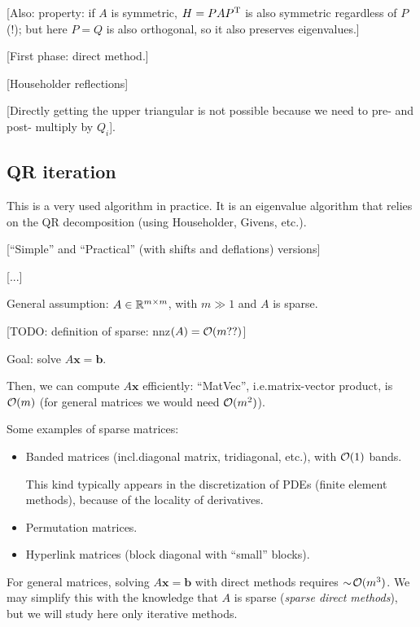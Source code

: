 \documentclass[
  12pt,
  paper=a4,
]{scrartcl} %
\begin{document}
[Also: property: if $A$ is symmetric, $H = PAP^{\mathrm{T}}$ is also symmetric regardless of $P$ (!); but here $P=Q$ is also orthogonal, so it also preserves eigenvalues.]

[First phase: direct method.]

[Householder reflections]

[Directly getting the upper triangular is not possible because we need to pre- and post- multiply by $Q_i$].

\subsection*{QR iteration}
This is a very used algorithm in practice. It is an eigenvalue algorithm that relies on the QR decomposition (using Householder, Givens, etc.).

[``Simple'' and ``Practical'' (with shifts and deflations) versions]

[...]

\newpage
{}

General assumption: $A\in\mathbb R^{m\times m}$, with $m\gg 1$ and $A$ is sparse.

[TODO: definition of sparse: nnz$(A)=\mathcal{O}(m??)$]

Goal: solve $A\bm x =\bm b$.

Then, we can compute $A\bm x$ efficiently: ``MatVec'', i.e.\@ matrix-vector product, is $\mathcal{O}(m)$ (for general matrices we would need $\mathcal{O}(m^2)$).

Some examples of sparse matrices: 
\begin{itemize}
    \item Banded matrices (incl.\@ diagonal matrix, tridiagonal, etc.), with $\mathcal{O}(1)$ bands.
    
    This kind typically appears in the discretization of PDEs (finite element methods), because of the locality of derivatives.
    
    \item Permutation matrices.

    \item Hyperlink matrices (block diagonal with ``small'' blocks).
    
\end{itemize}

For general matrices, solving $A\bm x = \bm b$ with direct methods requires $\sim\!\mathcal{O}(m^3)$. We may simplify this with the knowledge that $A$ is sparse (\emph{sparse direct methods}), but we will study here only iterative methods.
\end{document}
